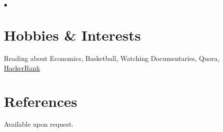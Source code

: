 \documentclass[margin,line]{res}
\newenvironment{list2}{
  \begin{list}{$\bullet$}{%
      \setlength{\itemsep}{0in}
      \setlength{\parsep}{0in} \setlength{\parskip}{0in}
      \setlength{\topsep}{0in} \setlength{\partopsep}{0in}
      \setlength{\leftmargin}{0.2in}}}{\end{list}}
\begin{document}
\begin{resume}
\begin{list2}
\end{list2}

\section{\sc Hobbies \& Interests}
Reading about Economics, Basketball, Watching Documentaries, Quora, {\href{https://www.hackerrank.com/sominwadhwa}{\color{blue} HackerRank}}



\section{\sc References }
Available upon request.

\end{resume}
\end{document}
